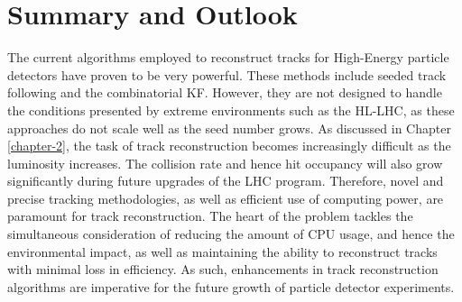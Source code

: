 

\chapter{Summary and Outlook}
\label{chapter-8}









The current algorithms employed to reconstruct tracks for High-Energy particle detectors have proven to be very powerful. These methods include seeded track following and the combinatorial KF. However, they are not designed to handle the conditions presented by extreme environments such as the HL-LHC, as these approaches do not scale well as the seed number grows. As discussed in Chapter \ref{chapter-2}, the task of track reconstruction becomes increasingly difficult as the luminosity increases. The collision rate and hence hit occupancy will also grow significantly during future upgrades of the LHC program. Therefore, novel and precise tracking methodologies, as well as efficient use of computing power, are paramount for track reconstruction. The heart of the problem tackles the simultaneous consideration of reducing the amount of CPU usage, and hence the environmental impact, as well as maintaining the ability to reconstruct tracks with minimal loss in efficiency. As such, enhancements in track reconstruction algorithms are imperative for the future growth of particle detector experiments. 


